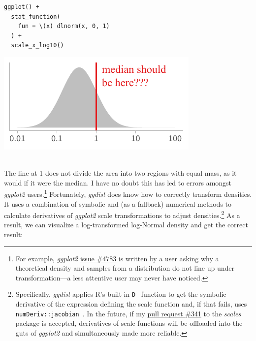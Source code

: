 \documentclass[journal]{vgtc}                     %
\begin{document}
\noindent
\begin{minipage}{.5\columnwidth}
\small
\begin{verbatim}
ggplot() +
  stat_function(
    fun = \(x) dlnorm(x, 0, 1)
  ) +
  scale_x_log10()
\end{verbatim}
\end{minipage}%
  \begin{minipage}{.4\columnwidth}
    \centering
    \includegraphics[width=1.2\columnwidth]{figs/3-jacobian-incorrect.pdf}
  \end{minipage}
\vspace{.5\belowdisplayskip}\\
The line at 1 does not divide the area into two regions with equal mass, as it would if it were the median. I have no doubt this has led to errors amongst \textit{ggplot2} users.\footnote{For example, \textit{ggplot2} \href{https://github.com/tidyverse/ggplot2/issues/4783}{issue \#4783} is written by a user asking why a theoretical density and samples from a distribution do not line up under transformation---a less attentive user may never have noticed.} Fortunately, \textit{ggdist} does know how to correctly transform densities. It uses a combination of symbolic and (as a fallback) numerical methods to calculate derivatives of \textit{ggplot2} scale transformations to adjust densities.\footnote{Specifically, \textit{ggdist} applies R's built-in \texttt{D}~\cite{r2022} function to get the symbolic derivative of the expression defining the scale function and, if that fails, uses \texttt{numDeriv::jacobian}~\cite{gilbert2016numderiv}. In the future, if my \href{https://github.com/r-lib/scales/pull/341}{pull request \#341} to the \textit{scales} package is accepted, derivatives of scale functions will be offloaded into the guts of \textit{ggplot2} and simultaneously made more reliable.} As a result, we can visualize a log-transformed log-Normal density and get the correct result:
\end{document}
